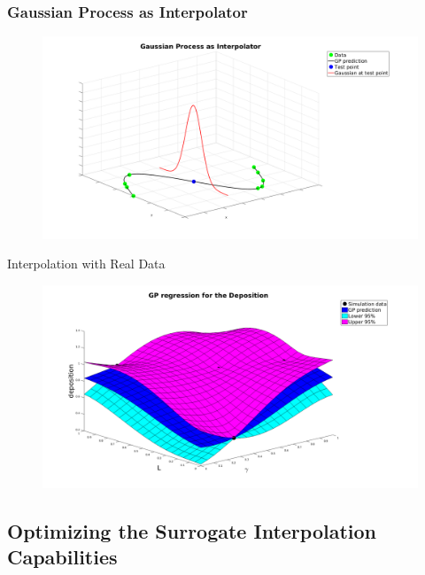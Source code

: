 \documentclass[11pt]{beamer}
\theoremstyle{plain}
\theoremstyle{definition}
\begin{document}








\begin{frame}
\frametitle{Gaussian Process as Interpolator}
\begin{figure}
\includegraphics[scale=0.25]{./codes/Gp_interpolation.png}
\end{figure}

\end{frame}


\begin{frame}{Interpolation with Real Data}


\begin{figure}
\includegraphics[scale=0.2]{./codes/GP_regression.png}
\end{figure}

\end{frame}

\subsection{Optimizing the Surrogate Interpolation Capabilities}
\end{document}
